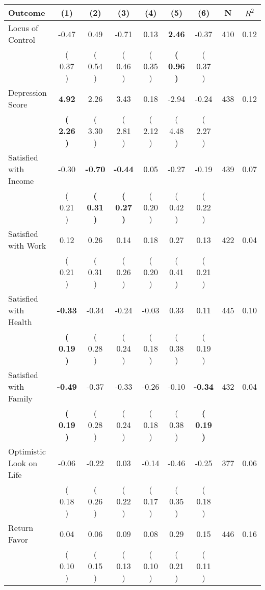 \begin{tabular}{lcccccccc}
\toprule
 \textbf{Outcome} & \textbf{(1)} & \textbf{(2)} & \textbf{(3)} & \textbf{(4)} & \textbf{(5)} & \textbf{(6)} & \textbf{N} & \textbf{$ R^2$} \\
\midrule
Locus of Control &     -0.47 &      0.49 &     -0.71 &      0.13 & \textbf{     2.46} &     -0.37 & 410 &       0.12 \\ 
 & (     0.37 ) & (     0.54 ) & (     0.46 ) & (     0.35 ) & \textbf{(     0.96 )} & (     0.37 ) & \\
Depression Score & \textbf{     4.92} &      2.26 &      3.43 &      0.18 &     -2.94 &     -0.24 & 438 &       0.12 \\ 
 & \textbf{(     2.26 )} & (     3.30 ) & (     2.81 ) & (     2.12 ) & (     4.48 ) & (     2.27 ) & \\
Satisfied with Income &     -0.30 & \textbf{    -0.70} & \textbf{    -0.44} &      0.05 &     -0.27 &     -0.19 & 439 &       0.07 \\ 
 & (     0.21 ) & \textbf{(     0.31 )} & \textbf{(     0.27 )} & (     0.20 ) & (     0.42 ) & (     0.22 ) & \\
Satisfied with Work &      0.12 &      0.26 &      0.14 &      0.18 &      0.27 &      0.13 & 422 &       0.04 \\ 
 & (     0.21 ) & (     0.31 ) & (     0.26 ) & (     0.20 ) & (     0.41 ) & (     0.21 ) & \\
Satisfied with Health & \textbf{    -0.33} &     -0.34 &     -0.24 &     -0.03 &      0.33 &      0.11 & 445 &       0.10 \\ 
 & \textbf{(     0.19 )} & (     0.28 ) & (     0.24 ) & (     0.18 ) & (     0.38 ) & (     0.19 ) & \\
Satisfied with Family & \textbf{    -0.49} &     -0.37 &     -0.33 &     -0.26 &     -0.10 & \textbf{    -0.34} & 432 &       0.04 \\ 
 & \textbf{(     0.19 )} & (     0.28 ) & (     0.24 ) & (     0.18 ) & (     0.38 ) & \textbf{(     0.19 )} & \\
Optimistic Look on Life &     -0.06 &     -0.22 &      0.03 &     -0.14 &     -0.46 &     -0.25 & 377 &       0.06 \\ 
 & (     0.18 ) & (     0.26 ) & (     0.22 ) & (     0.17 ) & (     0.35 ) & (     0.18 ) & \\
Return Favor &      0.04 &      0.06 &      0.09 &      0.08 &      0.29 &      0.15 & 446 &       0.16 \\ 
 & (     0.10 ) & (     0.15 ) & (     0.13 ) & (     0.10 ) & (     0.21 ) & (     0.11 ) & \\

\end{tabular}

